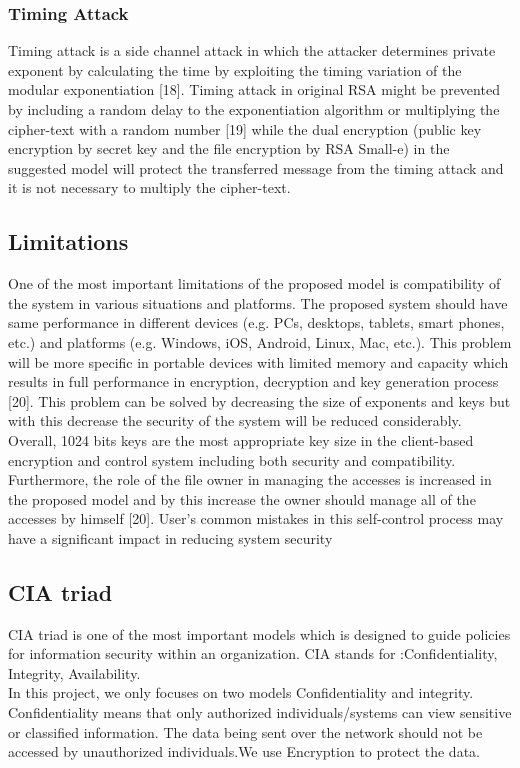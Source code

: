 \subsubsection{Timing Attack}
Timing attack is a side channel attack in which the attacker
determines private exponent by calculating the time by
exploiting the timing variation of the modular exponentiation
	[18]. Timing attack in original RSA might be prevented by
including a random delay to the exponentiation algorithm or
multiplying the cipher-text with a random number [19] while
the dual encryption (public key encryption by secret key and
the file encryption by RSA Small-e) in the suggested model
will protect the transferred message from the timing attack and
it is not necessary to multiply the cipher-text.

\subsection{Limitations}
One of the most important limitations of the proposed
model is compatibility of the system in various situations and
platforms. The proposed system should have same
performance in different devices (e.g. PCs, desktops, tablets,
smart phones, etc.) and platforms (e.g. Windows, iOS,
Android, Linux, Mac, etc.). This problem will be more
specific in portable devices with limited memory and capacity
which results in full performance in encryption, decryption
and key generation process [20]. This problem can be solved
by decreasing the size of exponents and keys but with this
decrease the security of the system will be reduced
considerably. Overall, 1024 bits keys are the most appropriate
key size in the client-based encryption and control system
including both security and compatibility. Furthermore, the
role of the file owner in managing the accesses is increased in
the proposed model and by this increase the owner should
manage all of the accesses by himself [20]. User’s common
mistakes in this self-control process may have a significant
impact in reducing system security

\subsection{CIA triad}
CIA triad is one of the most important models which is designed to guide policies
for information security within an organization.
CIA stands for :Confidentiality,
Integrity,
Availability.\\
In this project, we only focuses on two models Confidentiality and 	integrity.\\
Confidentiality means that only authorized individuals/systems can view sensitive or classified information. The data being sent over the network should not be accessed by unauthorized individuals.We use Encryption to protect the data.\\

